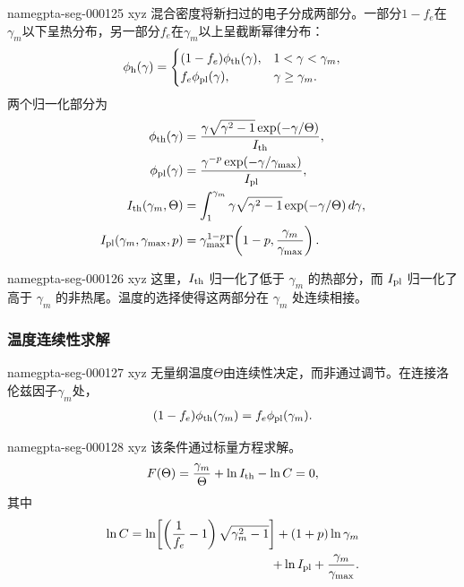 \documentclass[twocolumn]{aastex702}
\makeatletter
\providecommand{\gptareaderanchor}[1]{\pdfdest name{#1} xyz}%
\providecommand{\gptareaderanchor}[1]{\special{pdf:dest (#1) [ @thispage /XYZ @xpos @ypos null ]}}%
\makeatother
\begin{document}
\gptareaderanchor{gpta-seg-000125}%
混合密度将新扫过的电子分成两部分。一部分\(1-f_e\)在\(\gamma_m\)以下呈热分布，另一部分\(f_e\)在\(\gamma_m\)以上呈截断幂律分布：
\begin{equation}
\phi_{\rm h}(\gamma)=
\begin{cases}
(1-f_e)\phi_{\rm th}(\gamma), & 1<\gamma<\gamma_m,\\
f_e\phi_{\rm pl}(\gamma), & \gamma\ge\gamma_m .
\end{cases}
\end{equation}
两个归一化部分为
\begin{equation}
\begin{aligned}
\phi_{\rm th}(\gamma)&=
\frac{\gamma\sqrt{\gamma^2-1}\exp(-\gamma/\Theta)}
{I_{\rm th}},\\
\phi_{\rm pl}(\gamma)&=
\frac{\gamma^{-p}\exp(-\gamma/\gamma_{\max})}{I_{\rm pl}},\\
I_{\rm th}(\gamma_m,\Theta)&=
\int_1^{\gamma_m}\gamma\sqrt{\gamma^2-1}
\exp(-\gamma/\Theta)\,d\gamma,\\
I_{\rm pl}(\gamma_m,\gamma_{\max},p)&=
\gamma_{\max}^{1-p}\Gamma\!\left(1-p,\frac{\gamma_m}{\gamma_{\max}}\right).
\end{aligned}
\end{equation}

\gptareaderanchor{gpta-seg-000126}%
这里，\(I_{\rm th}\) 归一化了低于 \(\gamma_m\) 的热部分，而 \(I_{\rm pl}\) 归一化了高于 \(\gamma_m\) 的非热尾。温度的选择使得这两部分在 \(\gamma_m\) 处连续相接。

\subsubsection{温度连续性求解}


\gptareaderanchor{gpta-seg-000127}%
无量纲温度\(\Theta\)由连续性决定，而非通过调节。在连接洛伦兹因子\(\gamma_m\)处，
\begin{equation}
\begin{aligned}
(1-f_e)\phi_{\rm th}(\gamma_m)
=
f_e\phi_{\rm pl}(\gamma_m).
\end{aligned}
\end{equation}

\gptareaderanchor{gpta-seg-000128}%
该条件通过标量方程求解。
\begin{equation}
F(\Theta)=\frac{\gamma_m}{\Theta}+\ln I_{\rm th}-\ln C=0,
\end{equation}
其中
\begin{equation}
\begin{aligned}
\ln C=
\ln\!\left[\left(\frac{1}{f_e}-1\right)
\sqrt{\gamma_m^2-1}\right]
+(1+p)\ln\gamma_m\\
+\ln I_{\rm pl}+\frac{\gamma_m}{\gamma_{\max}} .
\end{aligned}
\end{equation}
\end{document}
